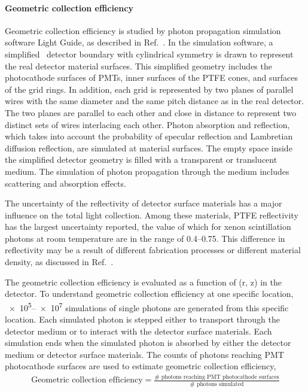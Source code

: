 \paragraph{Geometric collection efficiency} Geometric collection efficiency is studied by photon propagation simulation software Light Guide, as described in Ref.~\cite{Shutt2018}. In the simulation software, a simplified \gtest\ detector boundary with cylindrical symmetry is drawn to represent the real detector material surfaces.  This simplified geometry includes the photocathode surfaces of PMTs, inner surfaces of the PTFE cones, and surfaces of the grid rings. In addition, each grid is represented by two planes of parallel wires with the same diameter and the same pitch distance as in the real detector. The two planes are parallel to each other and close in distance to represent two distinct sets of wires interlacing each other.  %
Photon absorption and reflection, which takes into account  the probability of specular reflection and Lambretian diffusion reflection, are simulated at material surfaces. The empty space inside the simplified detector geometry is filled with a transparent or translucent medium. The simulation of photon propagation through the medium includes scattering and absorption effects.

The uncertainty of the reflectivity of detector surface materials has a major influence on the total light collection. Among these materials, PTFE reflectivity has the largest uncertainty reported, the value of which for xenon scintillation photons at room temperature are in the range of \numrange{0.4}{0.75}. This difference in reflectivity may be a result of different fabrication %
processes or different material density, as discussed in Ref.~\cite{Silva2009}.

The geometric collection efficiency is evaluated as a function of (r, z) in the detector. To understand geometric collection efficiency at one specific location, \numrange{e5}{e7} simulations of single photons are generated from this specific location. %
Each simulated photon is stepped either to transport through the detector medium or to interact with the detector surface materials. Each simulation ends when the simulated photon is absorbed by either the detector medium or detector surface materials. The counts of photons reaching PMT photocathode surfaces are used to estimate geometric collection efficiency,  
\begin{align}
	\text{Geometric collection efficiency} = \frac{\text{\#\  photons reaching PMT photocathode surfaces}}{\text{\#\  photons simulated}}
\end{align}

